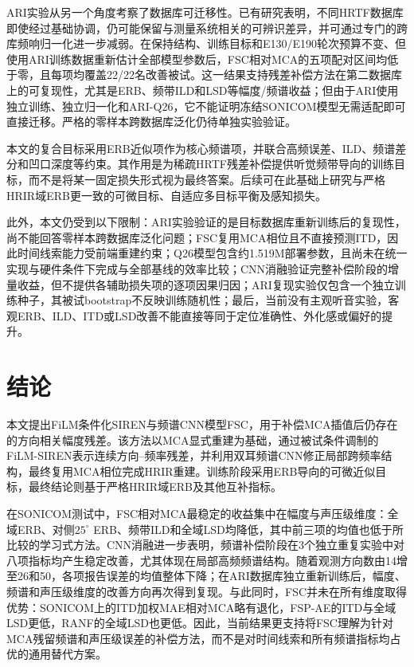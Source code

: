 \documentclass[UTF8,a4paper]{article}
\begin{document}
ARI实验从另一个角度考察了数据库可迁移性。已有研究表明，不同HRTF数据库即使经过基础协调，仍可能保留与测量系统相关的可辨识差异，并可通过专门的跨库频响归一化进一步减弱\cite{R24,R25}。在保持结构、训练目标和E130/E190轮次预算不变、但使用ARI训练数据重新估计全部模型参数后，FSC相对MCA的五项配对区间均低于零，且每项均覆盖22/22名改善被试。这一结果支持残差补偿方法在第二数据库上的可复现性，尤其是ERB、频带ILD和LSD等幅度/频谱收益；但由于ARI使用独立训练、独立归一化和ARI-Q26，它不能证明冻结SONICOM模型无需适配即可直接迁移。严格的零样本跨数据库泛化仍待单独实验验证。

本文的复合目标采用ERB近似项作为核心频谱项，并联合高频误差、ILD、频谱差分和凹口深度等约束。其作用是为稀疏HRTF残差补偿提供听觉频带导向的训练目标，而不是将某一固定损失形式视为最终答案。后续可在此基础上研究与严格HRIR域ERB更一致的可微目标、自适应多目标平衡及感知损失。

此外，本文仍受到以下限制：ARI实验验证的是目标数据库重新训练后的复现性，尚不能回答零样本跨数据库泛化问题；FSC复用MCA相位且不直接预测ITD，因此时间线索能力受前端重建约束；Q26模型包含约1.519M部署参数，且尚未在统一实现与硬件条件下完成与全部基线的效率比较；CNN消融验证完整补偿阶段的增量收益，但不提供各辅助损失项的逐项因果归因；ARI复现实验仅包含一个独立训练种子，其被试bootstrap不反映训练随机性；最后，当前没有主观听音实验，客观ERB、ILD、ITD或LSD改善不能直接等同于定位准确性、外化感或偏好的提升。

\section{结论}
\label{sec:conclusion}

本文提出FiLM条件化SIREN与频谱CNN模型FSC，用于补偿MCA插值后仍存在的方向相关幅度残差。该方法以MCA显式重建为基础，通过被试条件调制的FiLM-SIREN表示连续方向--频率残差，并利用双耳频谱CNN修正局部跨频率结构，最终复用MCA相位完成HRIR重建。训练阶段采用ERB导向的可微近似目标，最终结论则基于严格HRIR域ERB及其他互补指标。

在SONICOM测试中，FSC相对MCA最稳定的收益集中在幅度与声压级维度：全域ERB、对侧$25^\circ$ ERB、频带ILD和全域LSD均降低，其中前三项的均值也低于所比较的学习式方法。CNN消融进一步表明，频谱补偿阶段在3个独立重复实验中对八项指标均产生稳定改善，尤其体现在局部高频频谱结构。随着观测方向数由14增至26和50，各项报告误差的均值整体下降；在ARI数据库独立重新训练后，幅度、频谱和声压级维度的改善方向再次得到复现。与此同时，FSC并未在所有维度取得优势：SONICOM上的ITD加权MAE相对MCA略有退化，FSP-AE的ITD与全域LSD更低，RANF的全域LSD也更低。因此，当前结果更支持将FSC理解为针对MCA残留频谱和声压级误差的补偿方法，而不是对时间线索和所有频谱指标均占优的通用替代方案。
\end{document}
